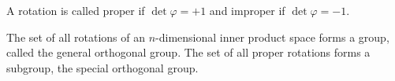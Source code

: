 A rotation is called proper if $\det \varphi = +1$ and improper if $\det \varphi = -1$.

The set of all rotations of an $n$-dimensional inner product space forms a group, called the general orthogonal group. The set of all proper rotations forms a subgroup, the special orthogonal group.
